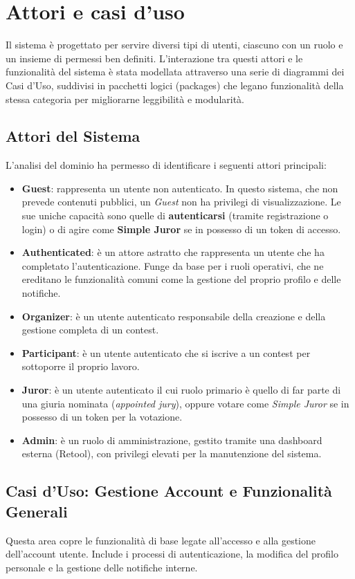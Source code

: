 \section{Attori e casi d’uso}\label{sec:attori-e-casi-duso}
Il sistema è progettato per servire diversi tipi di utenti, ciascuno con un ruolo e un insieme di permessi ben definiti.
L'interazione tra questi attori e le funzionalità del sistema è stata modellata attraverso una serie di diagrammi dei Casi d'Uso, suddivisi in pacchetti logici (packages) che legano funzionalità della stessa categoria per migliorarne leggibilità e modularità.

\subsection{Attori del Sistema}\label{subsec:attori-del-sistema}
L'analisi del dominio ha permesso di identificare i seguenti attori principali:
\begin{itemize}
	\item \textbf{Guest}: rappresenta un utente non autenticato.
	In questo sistema, che non prevede contenuti pubblici, un \emph{Guest} non ha privilegi di visualizzazione.
	Le sue uniche capacità sono quelle di \textbf{autenticarsi} (tramite registrazione o login) o di agire come \textbf{Simple Juror} se in possesso di un token di accesso.
	\item \textbf{Authenticated}: è un attore astratto che rappresenta un utente che ha completato l'autenticazione.
	Funge da base per i ruoli operativi, che ne ereditano le funzionalità comuni come la gestione del proprio profilo e delle notifiche.
	\item \textbf{Organizer}: è un utente autenticato responsabile della creazione e della gestione completa di un contest.
	\item \textbf{Participant}: è un utente autenticato che si iscrive a un contest per sottoporre il proprio lavoro.
	\item \textbf{Juror}: è un utente autenticato il cui ruolo primario è quello di far parte di una giuria nominata (\emph{appointed jury}), oppure votare come \emph{Simple Juror} se in possesso di un token per la votazione.
	\item \textbf{Admin}: è un ruolo di amministrazione, gestito tramite una dashboard esterna (Retool), con privilegi elevati per la manutenzione del sistema.
\end{itemize}

\subsection{Casi d'Uso: Gestione Account e Funzionalità Generali}\label{subsec:casi-d'uso:-gestione-account-e-funzionalita-generali}
Questa area copre le funzionalità di base legate all'accesso e alla gestione dell'account utente.
Include i processi di autenticazione, la modifica del profilo personale e la gestione delle notifiche interne.

